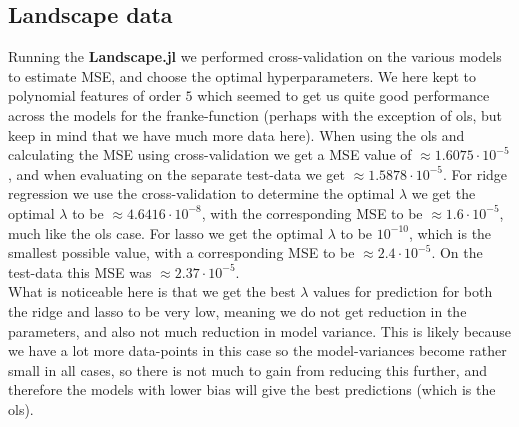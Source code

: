 \documentclass{article}
\begin{document}
\subsection{Landscape data}
Running the \textbf{Landscape.jl} we performed cross-validation on the various
models to estimate MSE, and choose the optimal hyperparameters. We here kept to
polynomial features of order $5$ which seemed to get us quite good performance
across the models for the franke-function (perhaps with the exception of ols,
but keep in mind that we have much more data here). When using the ols and
calculating the MSE using cross-validation we get a MSE value of $\approx
    1.6075\cdot 10^{-5}$, and when evaluating on the separate test-data we get
$\approx 1.5878 \cdot 10^{-5}$. For ridge regression we use the cross-validation
to determine the optimal $\lambda$ we get the optimal $\lambda$ to be $\approx
    4.6416 \cdot 10^{-8}$, with the corresponding MSE to be $\approx 1.6 \cdot
    10^{-5}$, much like the ols case. For lasso we get the optimal $\lambda$ to be
$10^{-10}$, which is the smallest possible value, with a corresponding MSE to be
$\approx 2.4 \cdot 10^{-5}$. On the test-data this MSE was $\approx 2.37 \cdot 10^{-5}$.
\\
What is noticeable here is that we get the best $\lambda$ values for prediction
for both the ridge and lasso to be very low, meaning we do not get reduction in
the parameters, and also not much reduction in model variance. This is likely
because we have a lot more data-points in this case so the model-variances
become rather small in all cases, so there is not much to gain from reducing
this further, and therefore the models with lower bias will give the best
predictions (which is the ols).
\end{document}
